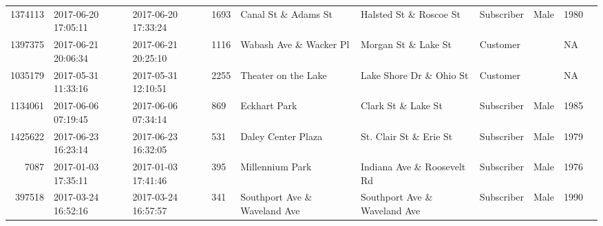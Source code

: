 \documentclass[11pt]{article}
\begin{document}
\begin{description}
\begin{tabular}{r|lllllllll}
	 1374113                             & 2017-06-20 17:05:11                 & 2017-06-20 17:33:24                 & 1693                                & Canal St \& Adams St               & Halsted St \& Roscoe St            & Subscriber                          & Male                                & 1980                               \\
	 1397375                             & 2017-06-21 20:06:34                 & 2017-06-21 20:25:10                 & 1116                                & Wabash Ave \& Wacker Pl            & Morgan St \& Lake St               & Customer                            &                                     &   NA                               \\
	 1035179                             & 2017-05-31 11:33:16                 & 2017-05-31 12:10:51                 & 2255                                & Theater on the Lake                 & Lake Shore Dr \& Ohio St           & Customer                            &                                     &   NA                               \\
	 1134061                             & 2017-06-06 07:19:45                 & 2017-06-06 07:34:14                 &  869                                & Eckhart Park                        & Clark St \& Lake St                & Subscriber                          & Male                                & 1985                               \\
	 1425622                             & 2017-06-23 16:23:14                 & 2017-06-23 16:32:05                 &  531                                & Daley Center Plaza                  & St. Clair St \& Erie St            & Subscriber                          & Male                                & 1979                               \\
	    7087                             & 2017-01-03 17:35:11                 & 2017-01-03 17:41:46                 &  395                                & Millennium Park                     & Indiana Ave \& Roosevelt Rd        & Subscriber                          & Male                                & 1976                               \\
	  397518                             & 2017-03-24 16:52:16                 & 2017-03-24 16:57:57                 &  341                                & Southport Ave \& Waveland Ave      & Southport Ave \& Waveland Ave      & Subscriber                          & Male                                & 1990                               \\

\end{tabular}
\end{description}
\end{document}

